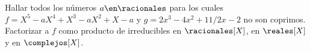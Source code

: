 \begin{enunciado}{\ejExtra} 
  Hallar todos los números $a \en \racionales$ para los cuales $f = X^5 - aX^4 + X^3 - aX^2 + X - a$
  y $g = 2x^3 - 4x^2 + 11/2x - 2$ no son coprimos. Factorizar a $f$ como producto de
  irreducibles en $\racionales[X]$, en $\reales[X]$ y en $\complejos[X]$.
\end{enunciado}
